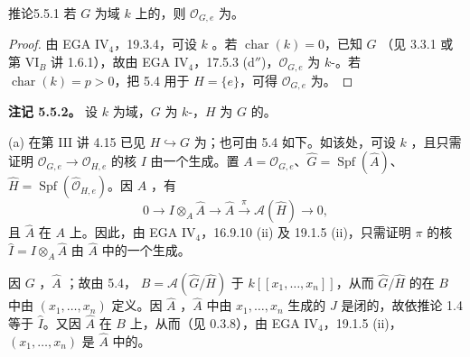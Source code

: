 \begin{SGAresult}{推论}{5.5.1}
若 $G$ 为域 $k$ 上的，则 $\mathcal O_{G,e}$ 为。
\end{SGAresult}
\begin{proof}
由 EGA IV$_4$，19.3.4，可设 $k$ 。若 $\operatorname{char}(k)=0$，已知 $G$ （见 3.3.1 或第 VI$_B$ 讲 1.6.1），故由 EGA IV$_4$，17.5.3 (d$''$)，$\mathcal O_{G,e}$ 为 $k$-。若 $\operatorname{char}(k)=p>0$，把 5.4 用于 $H=\{e\}$，可得 $\mathcal O_{G,e}$ 为。
\end{proof}

\textbf{注记 5.5.2。} 设 $k$ 为域，$G$ 为 $k$-，$H$ 为 $G$ 的。

(a) 在第 III 讲 4.15 已见 $H\hookrightarrow G$ 为；也可由 5.4 如下。如该处，可设 $k$ ，且只需证明 $\mathcal O_{G,e}\to\mathcal O_{H,e}$ 的核 $I$ 由一个生成。置 $A=\mathcal O_{G,e}$、$\widehat G=\operatorname{Spf}(\widehat A)$、$\widehat H=\operatorname{Spf}(\widehat{\mathcal O}_{H,e})$。因 $A$ ，有
\[
0\longrightarrow I\otimes_A\widehat A\longrightarrow\widehat A\xrightarrow{\pi}\mathcal A(\widehat H)\longrightarrow0,
\]
且 $\widehat A$ 在 $A$ 上。因此，由 EGA IV$_4$，16.9.10 (ii) 及 19.1.5 (ii)，只需证明 $\pi$ 的核 $\widehat I=I\otimes_A\widehat A$ 由 $\widehat A$ 中的一个生成。

因 $G$ ，$\widehat A$ ；故由 5.4， $B=\mathcal A(\widehat G/\widehat H)$ 于 $k[[x_1,\ldots,x_n]]$，从而 $\widehat G/\widehat H$ 的在 $B$ 中由 $(x_1,\ldots,x_n)$ 定义。因 $\widehat A$ ，$\widehat A$ 中由 $x_1,\ldots,x_n$ 生成的 $J$ 是闭的，故依推论 1.4 等于 $\widehat I$。又因 $\widehat A$ 在 $B$ 上，从而（见 0.3.8），由 EGA IV$_4$，19.1.5 (ii)，$(x_1,\ldots,x_n)$ 是 $\widehat A$ 中的。

